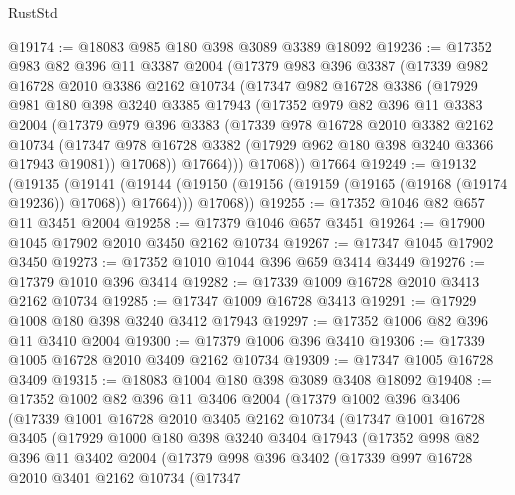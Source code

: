 \begin{lexlean}{RustStd}
\begin{coremodule}
@19174 := @18083 @985 @180 @398 @3089 @3389 @18092
@19236 := @17352
    @983
    @82
    @396
    @11
    @3387
    @2004
    (@17379
      @983
      @396
      @3387
      (@17339
        @982
        @16728
        @2010
        @3386
        @2162
        @10734
        (@17347
          @982
          @16728
          @3386
          (@17929
            @981
            @180
            @398
            @3240
            @3385
            @17943
            (@17352
              @979
              @82
              @396
              @11
              @3383
              @2004
              (@17379
                @979
                @396
                @3383
                (@17339
                  @978
                  @16728
                  @2010
                  @3382
                  @2162
                  @10734
                  (@17347 @978 @16728 @3382 (@17929 @962 @180 @398 @3240 @3366 @17943 @19081))
                  @17068))
              @17664)))
        @17068))
    @17664
@19249 := @19132
    (@19135
      (@19141
        (@19144 (@19150 (@19156 (@19159 (@19165 (@19168 (@19174 @19236)) @17068)) @17664)))
        @17068))
@19255 := @17352 @1046 @82 @657 @11 @3451 @2004
@19258 := @17379 @1046 @657 @3451
@19264 := @17900 @1045 @17902 @2010 @3450 @2162 @10734
@19267 := @17347 @1045 @17902 @3450
@19273 := @17352 @1010 @1044 @396 @659 @3414 @3449
@19276 := @17379 @1010 @396 @3414
@19282 := @17339 @1009 @16728 @2010 @3413 @2162 @10734
@19285 := @17347 @1009 @16728 @3413
@19291 := @17929 @1008 @180 @398 @3240 @3412 @17943
@19297 := @17352 @1006 @82 @396 @11 @3410 @2004
@19300 := @17379 @1006 @396 @3410
@19306 := @17339 @1005 @16728 @2010 @3409 @2162 @10734
@19309 := @17347 @1005 @16728 @3409
@19315 := @18083 @1004 @180 @398 @3089 @3408 @18092
@19408 := @17352
    @1002
    @82
    @396
    @11
    @3406
    @2004
    (@17379
      @1002
      @396
      @3406
      (@17339
        @1001
        @16728
        @2010
        @3405
        @2162
        @10734
        (@17347
          @1001
          @16728
          @3405
          (@17929
            @1000
            @180
            @398
            @3240
            @3404
            @17943
            (@17352
              @998
              @82
              @396
              @11
              @3402
              @2004
              (@17379
                @998
                @396
                @3402
                (@17339
                  @997
                  @16728
                  @2010
                  @3401
                  @2162
                  @10734
                  (@17347

\end{coremodule}
\end{lexlean}
